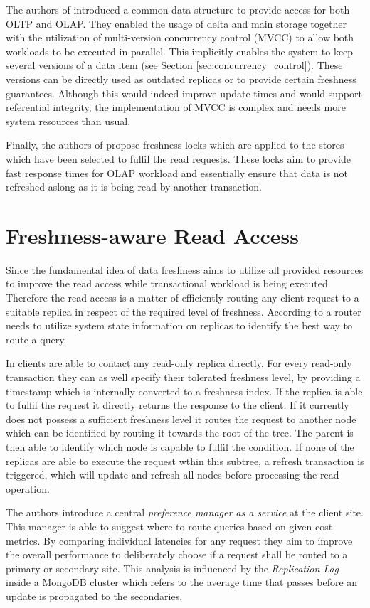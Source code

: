 The authors of \cite{psaroudakis:2015} introduced a common data structure to provide access for both OLTP and OLAP. 
They enabled the usage of delta and main storage together with the utilization of multi-version concurrency control (MVCC) to allow both workloads to be executed in parallel.
This implicitly enables the system to keep several versions of a data item (see Section \ref{sec:concurrency_control}).
These versions can be directly used as outdated replicas or to provide certain freshness guarantees.
Although this would indeed improve update times and would support referential integrity, the implementation of MVCC is complex and needs more system resources than usual.

Finally, the authors of \cite{akal:2005} propose freshness locks which are applied to the stores which have been selected to fulfil the read requests. 
These locks aim to provide fast response times for OLAP workload and essentially ensure that data is not refreshed aslong as it is being read by another transaction.



\section{Freshness-aware Read Access}
\label{r:read}
Since the fundamental idea of data freshness aims to utilize all provided resources to improve the read access while transactional workload is being executed.
Therefore the read access is a matter of efficiently routing any client request to a suitable replica in respect of the required level of freshness.
According to \cite{rohm:2002, akal:2005} a router needs to utilize system state information on replicas to identify the best way to route a query.

In \cite{voicu:2010} clients are able to contact any read-only replica directly. For every read-only transaction they can as well specify
their tolerated freshness level, by providing a timestamp which is internally converted to a freshness index. If the replica is able to fulfil the request 
it directly returns the response to the client. If it currently does not possess a sufficient freshness level it routes the request to another node which can be identified 
by routing it towards the root of the tree. The parent is then able to identify which node is capable to fulfil the condition.  
If none of the replicas are able to execute the request wthin this subtree, a refresh transaction is triggered, which will update and refresh all nodes before 
processing the read operation.

The authors \cite{huang:2020} introduce a central \emph{preference manager as a service} at the client site. This manager is able to suggest where to route queries 
based on given cost metrics. By comparing individual latencies for any request they aim to improve the overall performance to deliberately choose if a request 
shall be routed to a primary or secondary site. This analysis is influenced by the \emph{Replication Lag} inside a MongoDB cluster which refers to the average time 
that passes before an update is propagated to the secondaries. 





